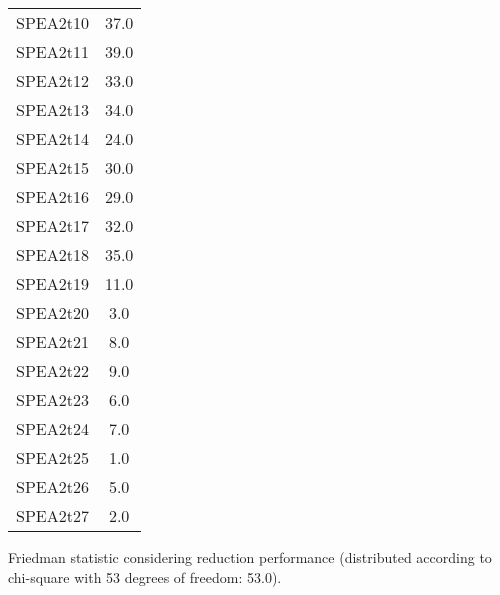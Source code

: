 \documentclass{article}
\begin{document}
\begin{table}[!htp]
\begin{tabular}{c|c}
SPEA2t10&37.0\\
SPEA2t11&39.0\\
SPEA2t12&33.0\\
SPEA2t13&34.0\\
SPEA2t14&24.0\\
SPEA2t15&30.0\\
SPEA2t16&29.0\\
SPEA2t17&32.0\\
SPEA2t18&35.0\\
SPEA2t19&11.0\\
SPEA2t20&3.0\\
SPEA2t21&8.0\\
SPEA2t22&9.0\\
SPEA2t23&6.0\\
SPEA2t24&7.0\\
SPEA2t25&1.0\\
SPEA2t26&5.0\\
SPEA2t27&2.0\\
\end{tabular}
\end{table}


Friedman statistic considering reduction performance (distributed according to chi-square with 53 degrees of freedom: 53.0).
\end{document}
